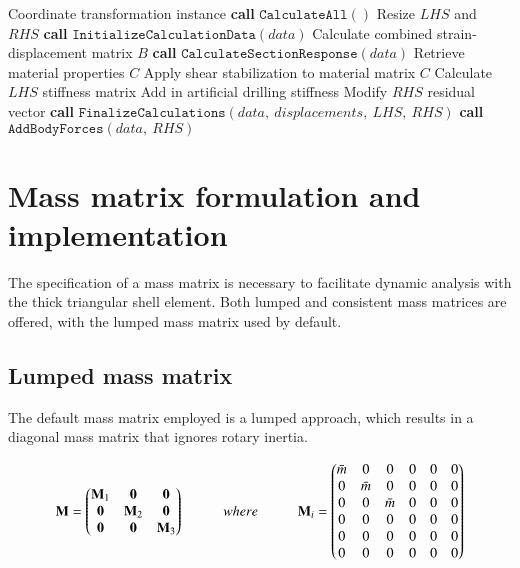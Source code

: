 \begin{algorithm}
	\onehalfspacing
	\label{DSG triangle element stiffness matrix}
	\begin{algorithmic}[1]
		\Require Coordinate transformation instance
		\State \textbf{call} $\texttt{CalculateAll}()$
		\State Resize $LHS$ and $RHS$
		\State \textbf{call} $\texttt{InitializeCalculationData}(data)$
		\State \hspace{\algorithmicindent}Calculate combined strain-displacement matrix $B$
		\State \textbf{call} $\texttt{CalculateSectionResponse}(data)$
		\State \hspace{\algorithmicindent}Retrieve material properties $C$
		\State \hspace{\algorithmicindent}Apply shear stabilization to material matrix $C$
		\State Calculate $LHS$ stiffness matrix
		\State Add in artificial drilling stiffness
		\State Modify $RHS$ residual vector
		\State \textbf{call} $\texttt{FinalizeCalculations}(data,\ displacements,\ LHS,\ RHS)$
		\State \textbf{call} $\texttt{AddBodyForces}(data,\ RHS)$
	\end{algorithmic}
\end{algorithm}




\section{Mass matrix formulation and implementation}

The specification of a mass matrix is necessary to facilitate dynamic analysis with the thick triangular shell element. Both lumped and consistent mass matrices are offered, with the lumped mass matrix used by default.

\subsection{Lumped mass matrix}
The default mass matrix employed is a lumped approach, which results in a diagonal mass matrix that ignores rotary inertia.

\begin{equation} 
\mathbf{M} =  
\begin{pmatrix}
\mathbf{M}_1 & \mathbf{0} & \mathbf{0}\\
\mathbf{0} & \mathbf{M}_2 & \mathbf{0}\\
\mathbf{0} & \mathbf{0} & \mathbf{M}_3
\end{pmatrix}
\hspace{10mm}
where
\hspace{10mm}
\mathbf{M}_i =  
\begin{pmatrix}
\bar{m} & 0 & 0 & 0 & 0 & 0\\
0 & \bar{m} & 0 & 0 & 0 & 0\\
0 & 0 & \bar{m} &0 & 0 & 0\\
0 & 0 & 0 & 0 & 0 & 0\\
0 & 0 & 0 & 0 & 0 & 0\\
0 & 0 & 0 & 0 & 0 & 0
\end{pmatrix}
\label{eqt15}
\end{equation}


